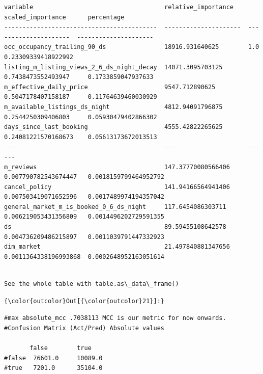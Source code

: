 \documentclass[11pt]{article}
\begin{document}
    
    \begin{verbatim}
variable                                    relative_importance    scaled_importance      percentage
------------------------------------------  ---------------------  ---------------------  ---------------------
occ_occupancy_trailing_90_ds                18916.931640625        1.0                    0.23309339418922992
listing_m_listing_views_2_6_ds_night_decay  14071.3095703125       0.7438473552493947     0.1733859047937633
m_effective_daily_price                     9547.712890625         0.5047178407158187     0.11764639460030929
m_available_listings_ds_night               4812.94091796875       0.2544250309406803     0.05930479402866302
days_since_last_booking                     4555.42822265625       0.24081221570168673    0.05613173672013513
---                                         ---                    ---                    ---
m_reviews                                   147.37770080566406     0.007790782543674447   0.0018159799464952792
cancel_policy                               141.94166564941406     0.007503419071652596   0.0017489974194357042
general_market_m_is_booked_0_6_ds_night     117.6454086303711      0.006219053431356809   0.0014496202729591355
ds                                          89.59455108642578      0.004736209486215897   0.0011039791447332923
dim_market                                  21.497840881347656     0.0011364338196993868  0.0002648952163051614
    \end{verbatim}

    
    \begin{Verbatim}[commandchars=\\\{\}]

See the whole table with table.as\_data\_frame()

    \end{Verbatim}

\begin{Verbatim}[commandchars=\\\{\}]
{\color{outcolor}Out[{\color{outcolor}21}]:} 
\end{Verbatim}
            
    \begin{verbatim}
#max absolute_mcc .7038113 MCC is our metric for now onwards. 
#Confusion Matrix (Act/Pred) Absolute values 

       false        true  
#false  76601.0     10089.0 
#true   7201.0      35104.0 
\end{verbatim}
\end{document}
